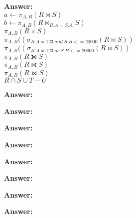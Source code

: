 \begin{questions}
\question 

\textbf{Answer:} \\
    $ a \leftarrow \pi_{A, B}(R\bowtie S)$ \\
    $ b \leftarrow \pi_{A, B}(R\bowtie_{R.A=S.A} S)$ \\
    $\pi_{A, B}(R\times S)$ \\
    $\pi_{A, B}((\sigma_{R.A=123 \; and \; S.B <= 20000}(R\bowtie S))$ \\
    $\pi_{A, B}((\sigma_{R.A=123 \; or \; S.B<=20000}(R\bowtie S))$ \\
    $\pi_{A, B}(R\leftouterjoin S)$ \\
    $\pi_{A, B}(R\rightouterjoin S)$ \\
    $\pi_{A, B}(R\fullouterjoin S)$ \\
    $R \cap S \cup T - U $ \\
    
\vspace{50 mm}
	
\question 

\textbf{Answer:} \\
\vspace{50 mm}

\question 

\textbf{Answer:} \\
\vspace{50 mm}

\question 

\textbf{Answer:} \\
\vspace{50 mm}

\question 

\textbf{Answer:}  \\
\vspace{50 mm}

\question 
\textbf{Answer:} \\
\vspace{50 mm}

\question 

\textbf{Answer:} \\
\vspace{50 mm}

\question 

\textbf{Answer:} \\
\vspace{50 mm}

\question 
\textbf{Answer:} \\
\vspace{50 mm}


\end{questions}
\bigskip 
\noindent



